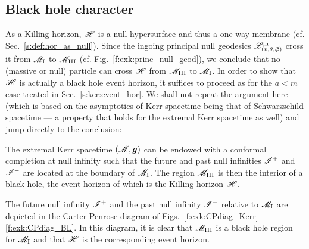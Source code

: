 \subsection{Black hole character} \label{s:exk:bhole_char}

As a Killing horizon, $\mathscr{H}$ is a null hypersurface and thus a one-way membrane
(cf. Sec.~\ref{s:def:hor_as_null}).
Since the ingoing principal null geodesics $\mathscr{L}^{\rm in}_{(v,\theta,{\tilde\varphi})}$
cross it from $\mathscr{M}_{\rm I}$ to $\mathscr{M}_{\rm III}$ (cf. Fig.~\ref{f:exk:princ_null_geod}),
we conclude that no (massive or null) particle can cross $\mathscr{H}$ from $\mathscr{M}_{\rm III}$
to $\mathscr{M}_{\rm I}$.
In order to show that $\mathscr{H}$ is actually a black hole event horizon,
it suffices to proceed as for the $a<m$ case treated in Sec.~\ref{s:ker:event_hor}.
We shall not repeat the argument here (which is based on the
asymptotics of Kerr spacetime being that of Schwarzschild spacetime --- a property
that holds for the extremal Kerr spacetime as well) and jump directly to the conclusion:
\begin{greybox}
The extremal Kerr spacetime $(\mathscr{M}, \bm{g})$ can be endowed with a conformal
completion at null infinity such that the future and past null infinities $\mathscr{I}^+$
and $\mathscr{I}^-$ are located at the boundary of $\mathscr{M}_{\rm I}$. The region $\mathscr{M}_{\rm III}$ is
then the interior of a black hole, the event horizon of which is
the Killing horizon $\mathscr{H}$.
\end{greybox}

The future null infinity $\mathscr{I}^+$ and the past null infinity $\mathscr{I}^-$
relative to $\mathscr{M}_{\rm I}$ are depicted in the Carter-Penrose diagram of
Figs.~\ref{f:exk:CPdiag_Kerr} -\ref{f:exk:CPdiag_BL}. In this diagram,
it is clear that $\mathscr{M}_{\rm III}$ is a black hole region for $\mathscr{M}_{\rm I}$
and that $\mathscr{H}$ is the corresponding event horizon.

